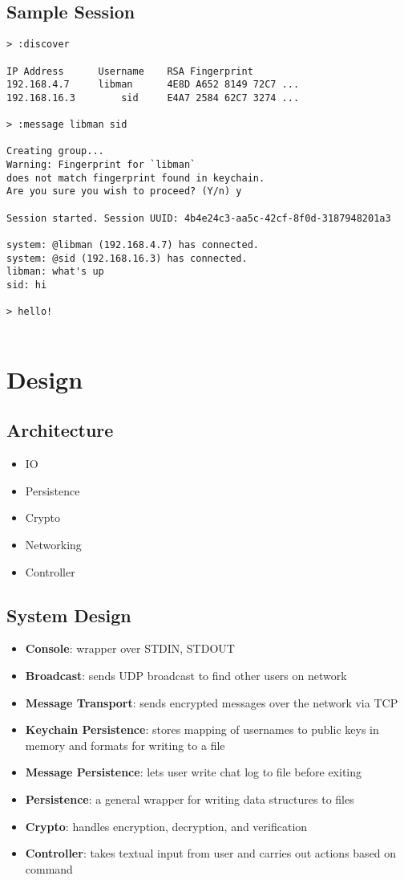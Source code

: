 \documentclass{scrartcl}
\begin{document}
\subsection{Sample Session}
\begin{lstlisting}
> :discover

IP Address		Username	RSA Fingerprint
192.168.4.7		libman		4E8D A652 8149 72C7 ...
192.168.16.3		sid		E4A7 2584 62C7 3274 ...

> :message libman sid

Creating group...
Warning: Fingerprint for `libman` 
does not match fingerprint found in keychain.
Are you sure you wish to proceed? (Y/n) y

Session started. Session UUID: 4b4e24c3-aa5c-42cf-8f0d-3187948201a3

system: @libman (192.168.4.7) has connected.
system: @sid (192.168.16.3) has connected.
libman: what's up
sid: hi

> hello!
		

\end{lstlisting}

\section{Design}
\subsection{Architecture}
\begin{itemize}
	\item IO
	\item Persistence
	\item Crypto
	\item Networking
	\item Controller
\end{itemize}

\subsection{System Design}
\begin{itemize}
	\item \textbf{Console}: wrapper over STDIN, STDOUT
	\item \textbf{Broadcast}: sends UDP broadcast to find other users on network
	\item \textbf{Message Transport}: sends encrypted messages over the network via TCP
	\item \textbf{Keychain Persistence}: stores mapping of usernames to public keys in memory and formats for writing to a file 
	\item \textbf{Message Persistence}: lets user write chat log to file before exiting
	\item \textbf{Persistence}: a general wrapper for writing data structures to files
	\item \textbf{Crypto}: handles encryption, decryption, and verification
	\item \textbf{Controller}: takes textual input from user and carries out actions based on command 
\end{itemize}
\end{document}
